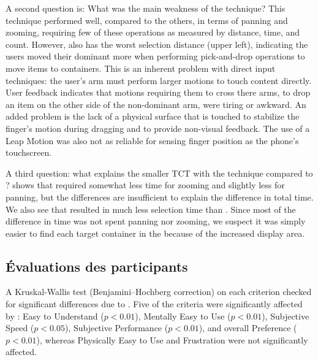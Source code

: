 
A second question is: What was the main weakness of the  technique? This technique performed well, compared to the others, in terms of panning and zooming, requiring few of these operations as measured by distance, time, and count. However,  also has the worst selection distance  (upper left), indicating the users moved their dominant more when performing pick-and-drop operations to move items to containers. This is an inherent problem with direct input techniques: the user's arm must perform larger motions to touch content directly. User feedback indicates that motions requiring them to cross there arms, to drop an item on the other side of the non-dominant arm, were tiring or awkward. An added problem is the lack of a physical surface that is touched to stabilize the finger's motion during dragging and to provide non-visual feedback. The use of a Leap Motion was also not as reliable for sensing finger position as the phone's touchscreen.

A third question: what explains the smaller TCT with the  technique compared to ?  shows that  required somewhat less time for zooming and slightly less for panning, but the differences are insufficient to explain the difference in total time. We also see that  resulted in much less selection time than . Since most of the difference in time was not spent panning nor zooming, we suspect it was simply easier to find each target container in the  because of the increased display area.

\subsection{Évaluations des participants}
\label{subsec:experiment_results_evaluations}

A Kruskal-Wallis test (Benjamini–Hochberg correction) on each criterion checked for significant differences due to . Five of the criteria were significantly affected by : Easy to Understand ($p<0.01$), Mentally Easy to Use ($p<0.01$), Subjective Speed ($p<0.05$), Subjective Performance ($p<0.01$), and overall Preference ($p<0.01$), whereas Physically Easy to Use and Frustration were not significantly affected.

